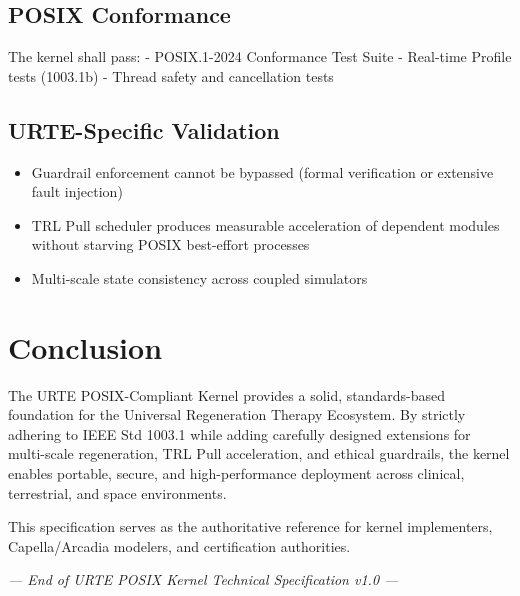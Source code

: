 \documentclass[11pt,a4paper]{report}
\begin{document}
\section{POSIX Conformance}

The kernel shall pass:
- POSIX.1-2024 Conformance Test Suite
- Real-time Profile tests (1003.1b)
- Thread safety and cancellation tests

\section{URTE-Specific Validation}

\begin{itemize}
    \item Guardrail enforcement cannot be bypassed (formal verification or extensive fault injection)
    \item TRL Pull scheduler produces measurable acceleration of dependent modules without starving POSIX best-effort processes
    \item Multi-scale state consistency across coupled simulators
\end{itemize}

\chapter{Conclusion}

The URTE POSIX-Compliant Kernel provides a solid, standards-based foundation for the Universal Regeneration Therapy Ecosystem. By strictly adhering to IEEE Std 1003.1 while adding carefully designed extensions for multi-scale regeneration, TRL Pull acceleration, and ethical guardrails, the kernel enables portable, secure, and high-performance deployment across clinical, terrestrial, and space environments.

This specification serves as the authoritative reference for kernel implementers, Capella/Arcadia modelers, and certification authorities.

\vspace{0.8cm}
\begin{center}
\textit{--- End of URTE POSIX Kernel Technical Specification v1.0 ---}
\end{center}

\appendix
\end{document}
